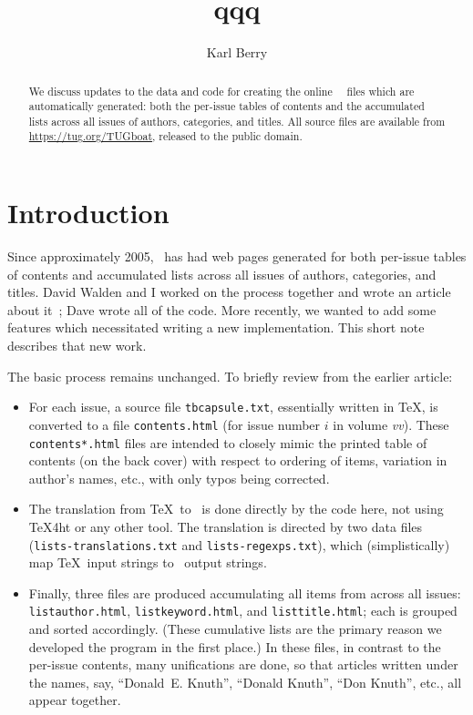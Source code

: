 \documentclass[final]{ltugboat}
\title{qqq}
\author{Karl Berry}
\def\code#1{{\tt #1}}
\begin{document}
\maketitle

\begin{abstract}
We discuss updates to the data and code for creating the online \TUB\
\HTML\ files which are automatically generated: both the per-issue
tables of contents and the accumulated lists across all issues of
authors, categories, and titles. All source files are available from
\url{https://tug.org/TUGboat}, released to the public domain.
\end{abstract}

\section{Introduction}

Since approximately 2005, \TUB\ has had web pages generated for both
per-issue tables of contents and accumulated lists across all issues of
authors, categories, and titles. David Walden and I worked on the
process together and wrote an article about it~\cite{Berry:TB32-1-23};
Dave wrote all of the code. More recently, we wanted to add some
features which necessitated writing a new implementation. This short
note describes that new work.

The basic process remains unchanged. To briefly review from the earlier
article:

\begin{itemize}
\item For each issue, a source file \code{tbcapsule.txt},
essentially written in \TeX, is converted to a file
\code{contents\meta{vv-i}.html} (for issue number $i$ in volume
\textit{vv}). These \code{contents*.html} files are intended to closely
mimic the printed table of contents (on the back cover) with respect to
ordering of items, variation in author's names, etc., with only typos
being corrected.

\item The translation from \TeX\ to \HTML\ is done directly by the code
here, not using \TeX4ht or any other tool. The translation is directed
by two data files (\code{lists-translations.txt} and
\code{lists-regexps.txt}), which (simplistically) map \TeX\ input
strings to \HTML\ output strings.

\item Finally, three files are produced accumulating all items from
across all issues: \code{listauthor.html}, \code{listkeyword.html}, and
\code{listtitle.html}; each is grouped and sorted accordingly. (These
cumulative lists are the primary reason we developed the program in the
first place.) In these files, in contrast to the per-issue contents,
many unifications are done, so that articles written under the names,
say, ``Donald~E. Knuth'', ``Donald Knuth'', ``Don Knuth'', etc., all
appear together.

\end{itemize}
\end{document}
